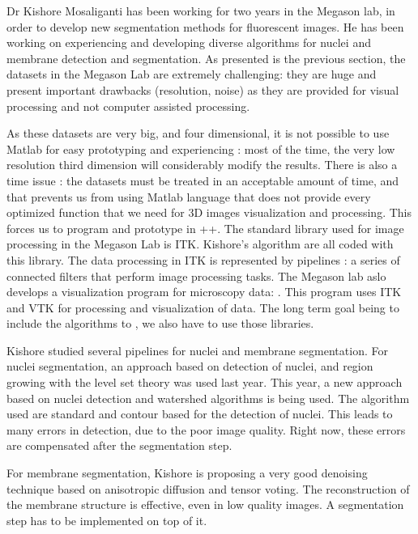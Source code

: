 Dr Kishore Mosaliganti has been working for two years in the Megason lab, in order to develop new segmentation methods for fluorescent images.
He has been working on experiencing and developing diverse algorithms for nuclei and membrane detection and segmentation.
As presented is the previous section, the datasets in the Megason Lab are extremely challenging:
they are huge and present important drawbacks (resolution, noise) as they are provided for visual processing and not computer assisted processing.

As these datasets are very big, and four dimensional, it is not possible to use Matlab for easy prototyping and experiencing : 
most of the time, the very low resolution third dimension will considerably modify the results.
There is also a time issue : the datasets must be treated in an acceptable amount of time,
and that prevents us from using Matlab language that does not provide every optimized function that we need for 3D images visualization and processing.
This forces us to program and prototype in {\C++}. The standard library used for image processing in the Megason Lab is ITK. Kishore's algorithm are all coded with this library.
The data processing in ITK is represented by pipelines : a series of connected filters that perform image processing tasks.
The Megason lab aslo develops a visualization program for microscopy data: {\gofigure}. This program uses ITK and VTK for processing and visualization of data. The long term goal being to include the algorithms to {\gofigure}, we also have to use those libraries.

Kishore studied several pipelines for nuclei and membrane segmentation.
For nuclei segmentation, an approach based on detection of nuclei, and region growing with the level set theory was used last year.
This year, a new approach based on nuclei detection and watershed algorithms is being used.
The algorithm used are standard and contour based for the detection of nuclei.
This leads to many errors in detection, due to the poor image quality. Right now, these errors are compensated after the segmentation step.

For membrane segmentation, Kishore is proposing a very good denoising technique based on anisotropic diffusion and tensor voting.
The reconstruction of the membrane structure is effective, even in low quality images. A segmentation step has to be implemented on top of it.
